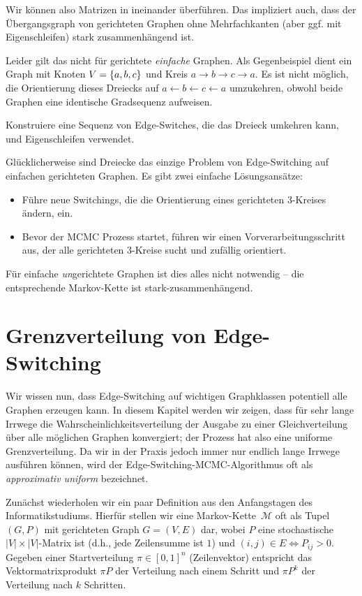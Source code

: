 Wir können also Matrizen in \msz ineinander überführen.
Das impliziert auch, dass der Übergangsgraph von gerichteten Graphen ohne Mehrfachkanten (aber ggf. mit Eigenschleifen) stark zusammenhängend ist.

Leider gilt das nicht für gerichtete \emph{einfache} Graphen.
Als Gegenbeispiel dient ein Graph mit Knoten $V = \left\{a,b,c\right\}$ und Kreis $a \to b \to c \to a$.
Es ist nicht möglich, die Orientierung dieses Dreiecks auf $a \leftarrow b \leftarrow c \leftarrow a$ umzukehren, obwohl beide Graphen eine identische Gradsequenz aufweisen.

\begin{exercise}
    Konstruiere eine Sequenz von Edge-Switches, die das Dreieck umkehren kann, und Eigenschleifen verwendet.
\end{exercise}

Glücklicherweise sind Dreiecke das einzige Problem von Edge-Switching auf einfachen gerichteten Graphen.
Es gibt zwei einfache Lösungsansätze:
\begin{itemize}
    \item Führe neue Switchings, die die Orientierung eines gerichteten 3-Kreises ändern, ein.
    \item Bevor der MCMC Prozess startet, führen wir einen Vorverarbeitungsschritt aus, der alle gerichteten 3-Kreise sucht und zufällig orientiert.
\end{itemize}

Für einfache \emph{un}gerichtete Graphen ist dies alles nicht notwendig -- die entsprechende Markov-Kette ist stark-zusammenhängend.

\section{Grenzverteilung von Edge-Switching}
Wir wissen nun, dass Edge-Switching auf wichtigen Graphklassen potentiell alle Graphen erzeugen kann.
In diesem Kapitel werden wir zeigen, dass für sehr lange Irrwege die Wahrscheinlichkeitsverteilung der Ausgabe zu einer Gleichverteilung über alle möglichen Graphen konvergiert;
der Prozess hat also eine uniforme Grenzverteilung.
Da wir in der Praxis jedoch immer nur endlich lange Irrwege ausführen können, wird der Edge-Switching-MCMC-Algorithmus oft als \emph{approximativ uniform} bezeichnet.

Zunächst wiederholen wir ein paar Definition aus den Anfangstagen des Informatikstudiums.
Hierfür stellen wir eine Markov-Kette~$\mathcal M$ oft als Tupel $(G, P)$ mit gerichteten Graph $G = (V, E)$ dar, wobei $P$ eine stochastische $|V| \times |V|$-Matrix ist (d.h., jede Zeilensumme ist $1$) und $(i, j) \in E \Leftrightarrow P_{ij} > 0$.
Gegeben einer Startverteilung $\pi \in [0, 1]^n$ (Zeilenvektor) entspricht das Vektormatrixprodukt $\pi P$ der Verteilung nach einem Schritt und $\pi P^k$ der Verteilung nach $k$ Schritten.

